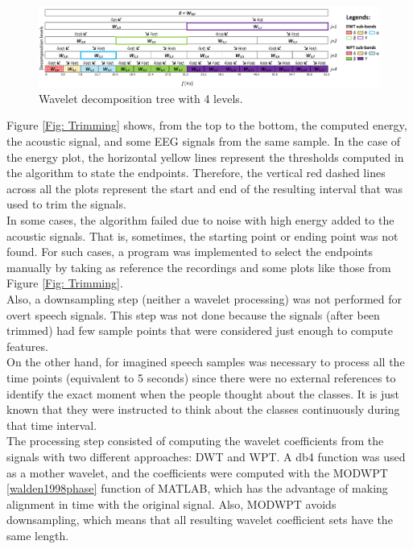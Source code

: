 \begin{figure}[h!]
\centering
\includegraphics[width=\linewidth]{Figures/Wavelets.png}
\caption{Wavelet decomposition tree with 4 levels.}
\label{Fig: Wavelet_decomp}
\end{figure}

Figure \ref{Fig: Trimming} shows, from the top to the bottom, the computed energy, the acoustic signal, and some EEG signals from the same sample. In the case of the energy plot, the horizontal yellow lines represent the thresholds computed in the algorithm to state the endpoints. Therefore, the vertical red dashed lines across all the plots represent the start and end of the resulting interval that was used to trim the signals.\\

In some cases, the algorithm failed due to noise with high energy added to the acoustic signals. That is, sometimes, the starting point or ending point was not found. For such cases, a program was implemented to select the endpoints manually by taking as reference the recordings and some plots like those from Figure \ref{Fig: Trimming}.\\

Also, a downsampling step (neither a wavelet processing) was not performed for overt speech signals. This step was not done because the signals (after been trimmed) had few sample points that were considered just enough to compute features.\\

On the other hand, for imagined speech samples was necessary to process all the time points (equivalent to 5 seconds) since there were no external references to identify the exact moment when the people thought about the classes. It is just known that they were instructed to think about the classes continuously during that time interval.\\

The processing step consisted of computing the wavelet coefficients from the signals with two different approaches: DWT and WPT. A db4 function was used as a mother wavelet, and the coefficients were computed with the MODWPT \ref{walden1998phase} function of MATLAB, which has the advantage of making alignment in time with the original signal. Also, MODWPT avoids downsampling, which means that all resulting wavelet coefficient sets have the same length.\\

